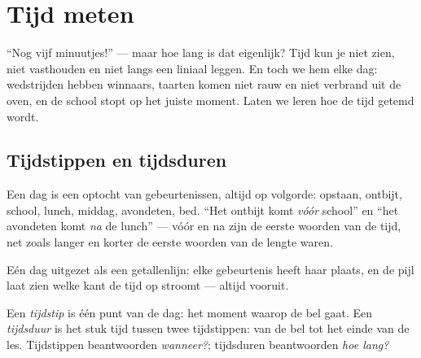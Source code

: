 \chapter{Tijd meten}\label{ch:g2:measuring-time}

``Nog vijf minuutjes!'' --- maar hoe lang is dat eigenlijk? Tijd kun je
niet zien, niet vasthouden en niet langs een liniaal leggen. En toch
 we hem elke dag: wedstrijden hebben winnaars, taarten komen
niet rauw en niet verbrand uit de oven, en de school stopt op het
juiste moment. Laten we leren hoe de tijd getemd wordt.

\section{Tijdstippen en tijdsduren}

\begin{example}\label{ex:g2:measuring-time:order}
Een dag is een optocht van gebeurtenissen, altijd op volgorde: opstaan,
ontbijt, school, lunch, middag, avondeten, bed. ``Het ontbijt komt
\emph{vóór} school'' en ``het avondeten komt \emph{na} de lunch'' ---
vóór en na zijn de eerste woorden van de tijd, net zoals langer en
korter de eerste woorden van de lengte waren.
\end{example}

\begin{omfigure}

{\small Eén dag uitgezet als een getallenlijn: elke gebeurtenis heeft
haar plaats, en de pijl laat zien welke kant de tijd op stroomt ---
altijd vooruit.}
\end{omfigure}

\begin{definition}[Tijdsduur]\label{def:g2:measuring-time:duration}
Een \emph{tijdstip} is één punt van de dag: het moment
waarop de bel gaat. Een \emph{tijdsduur} is het stuk
tijd tussen twee tijdstippen: van de bel tot het einde van de les.
Tijdstippen beantwoorden \emph{wanneer?}; tijdsduren beantwoorden
\emph{hoe lang?}
\end{definition}


